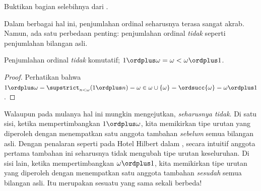 \documentclass[../../../include/open-logic-section]{subfiles}
\begin{document}
\begin{prob}
Buktikan bagian selebihnya dari
.
\end{prob}

Dalam berbagai hal ini, penjumlahan ordinal seharusnya terasa sangat akrab.
Namun, ada satu perbedaan penting: penjumlahan ordinal \emph{tidak} seperti
penjumlahan bilangan asli.

\begin{prop}
Penjumlahan ordinal \emph{tidak} komutatif;
$1\ordplus\omega=\omega<\omega\ordplus1$.
\end{prop}

\begin{proof}
Perhatikan bahwa $1\ordplus\omega=\supstrict_{n<\omega}(1\ordplus n)
=\omega\in\omega\cup\{\omega\}=\ordsucc{\omega}=\omega\ordplus1$.
\end{proof}
\noindent
Walaupun pada mulanya hal ini mungkin mengejutkan, \emph{seharusnya tidak}.
Di satu sisi, ketika mempertimbangkan $1\ordplus\omega$, kita memikirkan tipe
urutan yang diperoleh dengan menempatkan satu anggota tambahan \emph{sebelum}
semua bilangan asli. Dengan penalaran seperti pada Hotel Hilbert dalam
, secara intuitif anggota pertama tambahan
ini seharusnya tidak mengubah tipe urutan keseluruhan. Di sisi lain, ketika
mempertimbangkan $\omega\ordplus1$, kita memikirkan tipe urutan yang diperoleh
dengan menempatkan satu anggota tambahan \emph{sesudah} semua bilangan asli.
Itu merupakan sesuatu yang sama sekali berbeda!
\end{document}
